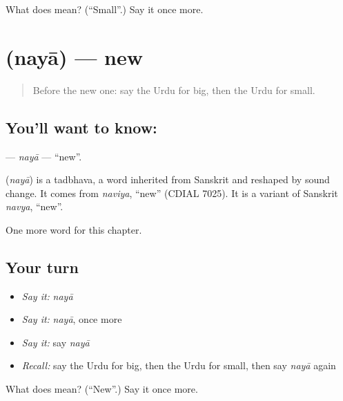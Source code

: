\begin{tcolorbox}[breakable,colback=teal!4,colframe=teal!35!black,title={Before you move on}]
What does  mean? (\textquotedblleft{}Small\textquotedblright{}.) Say it once more.
\end{tcolorbox}
\section[\texorpdfstring{\ur{نیا} (nayā)}{نیا (nayā)}]{ (nayā) — new}

\label{lesson:UR-C70-naya}



\begin{quote}
Before the new one: say the Urdu for big, then the Urdu for small.
\end{quote}

\subsection*{You'll want to know: }
\textbf{} — \emph{nayā} — \textquotedblleft{}new\textquotedblright{}.

\begin{cousinweb}
\textbf{} (\emph{nayā}) is a tadbhava, a word inherited from Sanskrit and reshaped by sound change. It comes from \emph{naviya}, \textquotedblleft{}new\textquotedblright{} (CDIAL 7025). It is a variant of Sanskrit \emph{navya}, \textquotedblleft{}new\textquotedblright{}.
\end{cousinweb}

\begin{grammarlens}[title={What you've built}]
One more word for this chapter.
\end{grammarlens}

\subsection*{Your turn}
\begin{itemize}
\raggedright
  \item \emph{Say it:} \emph{nayā}
  \item \emph{Say it:} \emph{nayā}, once more
  \item \emph{Say it:} say \emph{nayā}
  \item \emph{Recall:} say the Urdu for big, then the Urdu for small, then say \emph{nayā} again
\end{itemize}

\begin{tcolorbox}[breakable,colback=teal!4,colframe=teal!35!black,title={Before you move on}]
What does  mean? (\textquotedblleft{}New\textquotedblright{}.) Say it once more.
\end{tcolorbox}
